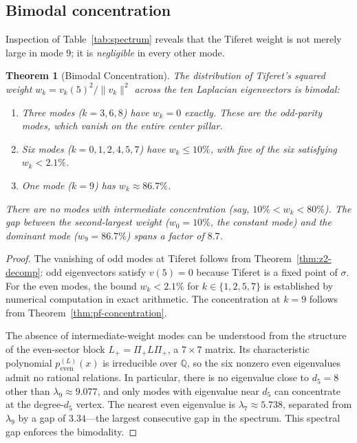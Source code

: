 \documentclass[11pt,a4paper]{amsart}
\newtheorem{theorem}{Theorem}[section]
\theoremstyle{remark}
\newcommand{\bbQ}{\mathbb{Q}}
\begin{document}
\subsection{Bimodal concentration}
\label{sec:bimodal}

Inspection of Table~\ref{tab:spectrum} reveals that the Tiferet weight is
not merely large in mode $9$; it is \emph{negligible} in every other mode.

\begin{theorem}[Bimodal Concentration]
\label{thm:bimodal}
The distribution of Tiferet's squared weight $w_k = v_k(5)^2 / \|v_k\|^2$
across the ten Laplacian eigenvectors is bimodal:
\begin{enumerate}[leftmargin=*,label=\textup{(\roman*)}]
\item Three modes ($k = 3, 6, 8$) have $w_k = 0$ exactly. These are the
  odd-parity modes, which vanish on the entire center pillar.
\item Six modes ($k = 0, 1, 2, 4, 5, 7$) have $w_k \le 10\%$, with five of
  the six satisfying $w_k < 2.1\%$.
\item One mode ($k = 9$) has $w_k \approx 86.7\%$.
\end{enumerate}
There are no modes with intermediate concentration (say,
$10\% < w_k < 80\%$). The gap between the second-largest weight
($w_0 = 10\%$, the constant mode) and the dominant mode ($w_9 = 86.7\%$)
spans a factor of $8.7$.
\end{theorem}

\begin{proof}
The vanishing of odd modes at Tiferet follows from
Theorem~\ref{thm:z2-decomp}: odd eigenvectors satisfy $v(5) = 0$ because
Tiferet is a fixed point of $\sigma$. For the even modes, the bound
$w_k < 2.1\%$ for $k \in \{1,2,5,7\}$ is established by numerical
computation in exact arithmetic. The concentration at $k = 9$ follows from
Theorem~\ref{thm:pf-concentration}.

The absence of intermediate-weight modes can be understood from the
structure of the even-sector block $L_+ = \Pi_+ L \Pi_+$, a
$7 \times 7$ matrix. Its characteristic polynomial $p_{\text{even}}^{(L)}(x)$
is irreducible over $\bbQ$, so the six nonzero even eigenvalues admit no
rational relations. In particular, there is no eigenvalue close to
$d_5 = 8$ other than $\lambda_9 \approx 9.077$, and only modes with
eigenvalue near $d_5$ can concentrate at the degree-$d_5$ vertex. The
nearest even eigenvalue is $\lambda_7 \approx 5.738$, separated from
$\lambda_9$ by a gap of $3.34$---the largest consecutive gap in the
spectrum. This spectral gap enforces the bimodality.
\end{proof}
\end{document}
